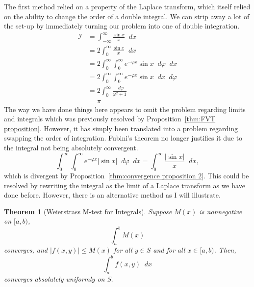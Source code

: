 \documentclass[a4paper]{article}
\newcommand*\diff{\mathop{}\!d} %
\newtheorem{theorem}{Theorem}
\theoremstyle{definition}
\begin{document}
The first method relied on a property of the Laplace transform, which itself relied on the ability to change the order of a double integral.
We can strip away a lot of the set-up by immediately turning our problem into one of double integration.
\begin{align*}
    \mathcal{I} & = \int_{-\infty}^{\infty} \frac{\sin x}{x} \diff x                                  \\
                & = 2\int_{0}^{\infty} \frac{\sin x}{x} \diff x                                       \\
                & = 2\int_{0}^{\infty} \int_{0}^{\infty} e^{-\varphi x} \sin x  \diff \varphi \diff x \\
                & = 2\int_{0}^{\infty} \int_{0}^{\infty} e^{-\varphi x} \sin x  \diff x \diff \varphi \\
                & = 2\int_{0}^{\infty} \frac{\diff \varphi}{\varphi^2 + 1}                            \\
                & = \pi
\end{align*}
The way we have done things here appears to omit the problem regarding limits and integrals which was previously resolved by Proposition~\ref{thm:FVT proposition}.
However, it has simply been translated into a problem regarding swapping the order of integration.
Fubini's theorem no longer justifies it due to the integral not being absolutely convergent.
\begin{equation*}
    \int_{0}^{\infty} \int_{0}^{\infty} e^{-\varphi x} | \sin x | \diff \varphi \diff x = \int_{0}^{\infty} \frac{|\sin x|}{x} \diff x,
\end{equation*}
which is divergent by Proposition~\ref{thm:convergence proposition 2}.
This could be resolved by rewriting the integral as the limit of a Laplace transform as we have done before.
However, there is an alternative method as I will illustrate.
\begin{theorem}[Weierstrass M-test for Integrals] \label{thm:Weierstrass M-test}
    Suppose $M(x)$ is nonnegative on $[a,b)$,
    \begin{equation*}
        \int_{a}^{b} M(x)
    \end{equation*}
    converges, and $|f(x,y)| \leq M(x)$ for all $y \in S$ and for all $x \in [a,b)$.
    Then,
    \begin{equation*}
        \int_{a}^{b} f(x,y) \diff x
    \end{equation*}
    converges absolutely uniformly on S.
\end{theorem}
\end{document}

